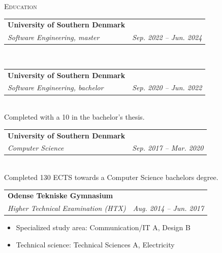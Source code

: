 \documentclass[11pt]{article}
\makeatletter
\newcommand{\resumeSubheading}[4]{
  \noindent\begin{tabular*}{0.98\textwidth}[t]{l@{\extracolsep{\fill}}r}
    \noindent \textbf{#1} & #2 \\ \vspace{-3pt} 
    \noindent \textit{\small#3} & \textit{\small #4} 
  \end{tabular*}\vspace{7pt}
}
\makeatother
\begin{document}
\vspace{0.5cm}


\noindent\large{\scshape{Education}} \newline
\noindent{\rule[0.3cm]{\textwidth}{0.4pt}}

\resumeSubheading{University of Southern Denmark}{}{Software Engineering, master}{Sep.
2022 -- Jun. 2024}\\\vspace{0.25cm}

\resumeSubheading{University of Southern Denmark}{}{Software Engineering, bachelor}{Sep.
2020 -- Jun. 2022}\\\vspace{0.25cm}
{\indent\small Completed with a 10 in the bachelor's thesis.}

\resumeSubheading{University of Southern Denmark}{}{Computer Science}{Sep. 2017
-- Mar. 2020}\\\vspace{0.25cm} 
{\indent\small Completed 130 ECTS towards a Computer Science bachelors degree.}
\vspace{0.3cm}

\resumeSubheading{Odense Tekniske Gymnasium}{}{Higher Technical
Examination (HTX)}{Aug. 2014 -- Jun. 2017}
{\small \begin{itemize}\vspace{-0.25cm}
  \setlength{\itemsep}{-1pt}
  \item Specialized study area: Communication/IT A, Design B
  \item Technical science: Technical Sciences A, Electricity
\end{itemize}
} \vspace{0.5cm}
\end{document}
